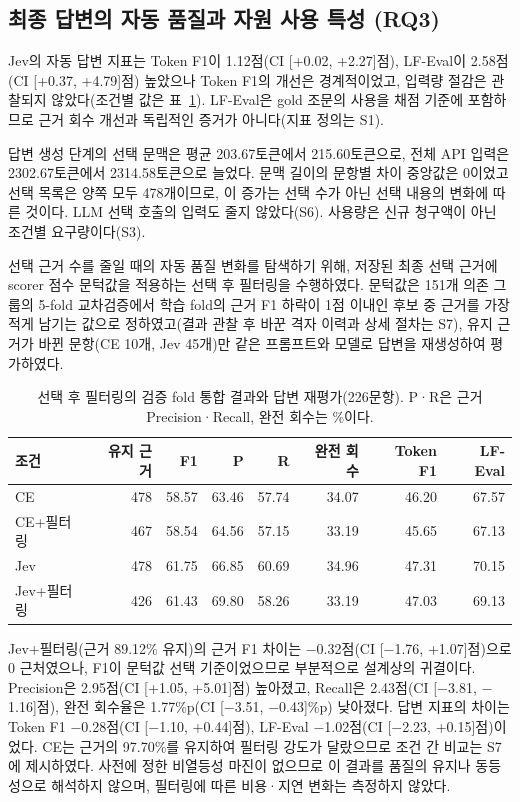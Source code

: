 \subsection{최종 답변의 자동 품질과 자원 사용 특성 (RQ3)}

\label{sec:ch4_4}

Jev의 자동 답변 지표는 Token F1이 1.12점(CI [+0.02, +2.27]점), LF-Eval이 2.58점(CI [+0.37, +4.79]점) 높았으나 Token F1의 개선은 경계적이었고, 입력량 절감은 관찰되지 않았다(조건별 값은 표~\ref{tab:ch4_4}). LF-Eval은 gold 조문의 사용을 채점 기준에 포함하므로 근거 회수 개선과 독립적인 증거가 아니다(지표 정의는 S1).

답변 생성 단계의 선택 문맥은 평균 203.67토큰에서 215.60토큰으로, 전체 API 입력은 2302.67토큰에서 2314.58토큰으로 늘었다. 문맥 길이의 문항별 차이 중앙값은 0이었고 선택 목록은 양쪽 모두 478개이므로, 이 증가는 선택 수가 아닌 선택 내용의 변화에 따른 것이다. LLM 선택 호출의 입력도 줄지 않았다(S6). 사용량은 신규 청구액이 아닌 조건별 요구량이다(S3).

선택 근거 수를 줄일 때의 자동 품질 변화를 탐색하기 위해, 저장된 최종 선택 근거에 scorer 점수 문턱값을 적용하는 선택 후 필터링을 수행하였다. 문턱값은 151개 의존 그룹의 5-fold 교차검증에서 학습 fold의 근거 F1 하락이 1점 이내인 후보 중 근거를 가장 적게 남기는 값으로 정하였고(결과 관찰 후 바꾼 격자 이력과 상세 절차는 S7), 유지 근거가 바뀐 문항(CE 10개, Jev 45개)만 같은 프롬프트와 모델로 답변을 재생성하여 평가하였다.

\begin{table}[H]
\centering
\caption{선택 후 필터링의 검증 fold 통합 결과와 답변 재평가(226문항). P·R은 근거 Precision·Recall, 완전 회수는 \%이다.}
\label{tab:ch4_4}
\scriptsize
\setlength{\tabcolsep}{1.5pt}
\begin{tabular}{@{}lrrrrrrr@{}}
\hline
조건 & 유지 근거 & F1 & P & R & 완전 회수 & Token F1 & LF-Eval \\
\hline
CE & 478 & 58.57 & 63.46 & 57.74 & 34.07 & 46.20 & 67.57 \\
CE+필터링 & 467 & 58.54 & 64.56 & 57.15 & 33.19 & 45.65 & 67.13 \\
Jev & 478 & 61.75 & 66.85 & 60.69 & 34.96 & 47.31 & 70.15 \\
Jev+필터링 & 426 & 61.43 & 69.80 & 58.26 & 33.19 & 47.03 & 69.13 \\
\hline
\end{tabular}
\end{table}

Jev+필터링(근거 89.12\% 유지)의 근거 F1 차이는 $-$0.32점(CI [$-$1.76, +1.07]점)으로 0 근처였으나, F1이 문턱값 선택 기준이었으므로 부분적으로 설계상의 귀결이다. Precision은 2.95점(CI [+1.05, +5.01]점) 높아졌고, Recall은 2.43점(CI [$-$3.81, $-$1.16]점), 완전 회수율은 1.77\%p(CI [$-$3.51, $-$0.43]\%p) 낮아졌다. 답변 지표의 차이는 Token F1 $-$0.28점(CI [$-$1.10, +0.44]점), LF-Eval $-$1.02점(CI [$-$2.23, +0.15]점)이었다. CE는 근거의 97.70\%를 유지하여 필터링 강도가 달랐으므로 조건 간 비교는 S7에 제시하였다. 사전에 정한 비열등성 마진이 없으므로 이 결과를 품질의 유지나 동등성으로 해석하지 않으며, 필터링에 따른 비용·지연 변화는 측정하지 않았다.
